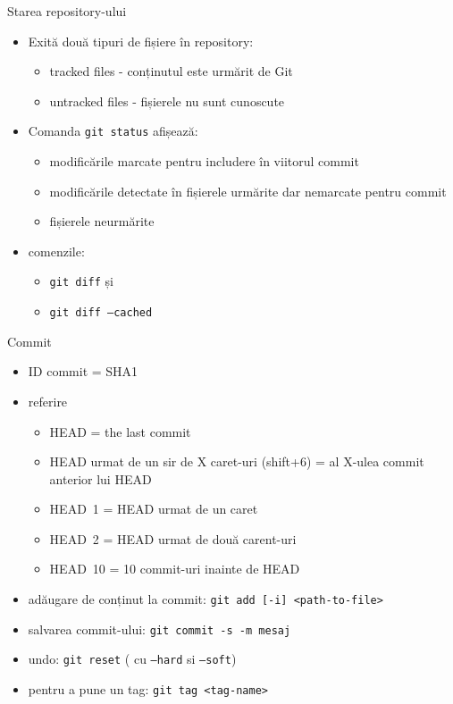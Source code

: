 \documentclass{beamer}
\begin{document}
\begin{frame}{Starea repository-ului}
\begin{itemize} %
\item Exită două tipuri de fișiere în repository:
\begin{itemize} %
	\item tracked files - conținutul este urmărit de Git
	\item untracked files - fișierele nu sunt cunoscute
\end{itemize}
\pause\item Comanda \texttt{git status} afișează:
\begin{itemize} %
	\item modificările marcate pentru includere în viitorul commit
	\item modificările detectate în fișierele urmărite dar nemarcate pentru commit
	\item fișierele neurmărite
\end{itemize}
\item comenzile:
\begin{itemize} %
	\item \texttt{git diff} și
	\item \texttt{git diff --cached}
\end{itemize}
\end{itemize}
\end{frame}

\begin{frame}{Commit}
\begin{itemize} %
\item ID commit = SHA1
\item referire
\begin{itemize}
	\item HEAD = the last commit
	\item HEAD urmat de un sir de X caret-uri (shift+6) = al X-ulea commit anterior lui HEAD
	\item HEAD~1 = HEAD urmat de un caret
    \item HEAD~2 = HEAD urmat de două carent-uri
    \item HEAD~10 = 10 commit-uri inainte de HEAD
\end{itemize}
\pause\item adăugare de conținut la commit: \texttt{git add [-i] <path-to-file>}
\item salvarea commit-ului: \texttt{git commit -s -m mesaj}
\item undo: \texttt{git reset} ( cu \texttt{--hard} si \texttt{--soft})
\\
\item pentru a pune un tag: \texttt{git tag <tag-name>}
\end{itemize}
\end{frame}
\end{document}
